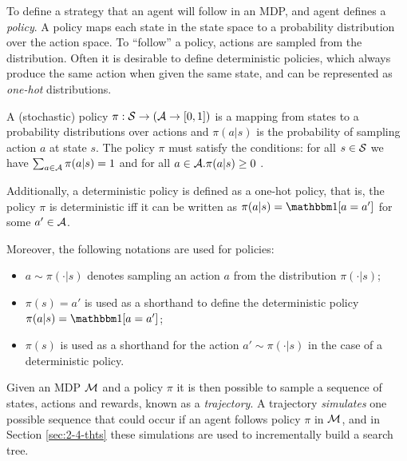     To define a strategy that an agent will follow in an MDP, and agent defines a \textit{policy}. A policy maps each state in the state space to a probability distribution over the action space. To ``follow'' a policy, actions are sampled from the distribution. Often it is desirable to define deterministic policies, which always produce the same action when given the same state, and can be represented as \textit{one-hot} distributions. 

    \begin{defn}
        \label{def:policy}
        A \textnormal{(stochastic) policy} $\pi:\mathcal{S}\rightarrow (\mathcal{A} \rightarrow [0,1])$ is a mapping from states to a probability distributions over actions and $\pi(a|s)$ is the probability of sampling action $a$ at state $s$. The policy $\pi$ must satisfy the conditions: for all $s \in \mathcal{S}$ we have $\sum_{a\in\mathcal{A}} \pi(a|s) = 1$ and for all $a\in\mathcal{A}. \pi(a|s)\geq 0$ . 
        
        Additionally, a \textnormal{deterministic policy} is defined as a one-hot policy, that is, the policy $\pi$ is deterministic iff it can be written as $\pi(a|s)=\one[a=a']$ for some $a'\in\mathcal{A}$.

        Moreover, the following notations are used for policies:
        \begin{itemize}
            \item $a\sim\pi(\cdot|s)$ denotes sampling an action $a$ from the distribution $\pi(\cdot|s)$;
            \item $\pi(s)=a'$ is used as a shorthand to define the deterministic policy $\pi(a|s)=\one[a=a']$; 
            \item $\pi(s)$ is used as a shorthand for the action $a'\sim\pi(\cdot|s)$ in the case of a deterministic policy.
        \end{itemize}
    \end{defn}
    
    Given an MDP $\mathcal{M}$ and a policy $\pi$ it is then possible to sample a sequence of states, actions and rewards, known as a \textit{trajectory}. A trajectory \textit{simulates} one possible sequence that could occur if an agent follows policy $\pi$ in $\mathcal{M}$, and in Section \ref{sec:2-4-thts} these simulations are used to incrementally build a search tree.
    
